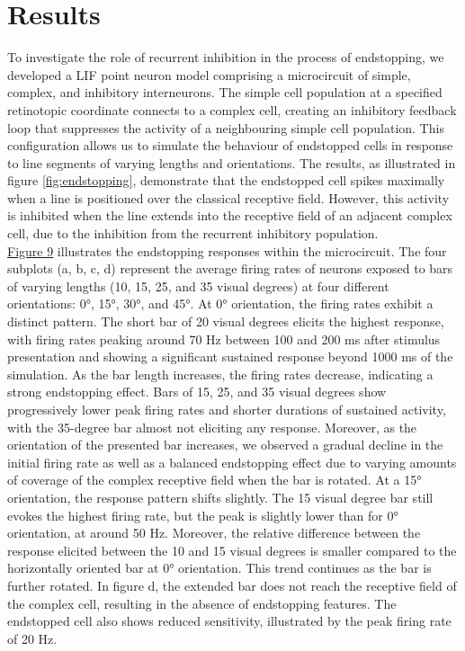 \documentclass[12pt]{article}
\begin{document}
\section*{Results}
\setlength{\parindent}{24pt}
To investigate the role of recurrent inhibition in the process of endstopping, we developed a LIF point neuron model comprising a microcircuit of simple, complex, and inhibitory interneurons. The simple cell population at a specified retinotopic coordinate connects to a complex cell, creating an inhibitory feedback loop that suppresses the activity of a neighbouring simple cell population. This configuration allows us to simulate the behaviour of endstopped cells in response to line segments of varying lengths and orientations. The results, as illustrated in figure \ref{fig:endstopping}, demonstrate that the endstopped cell spikes maximally when a line is positioned over the classical receptive field. However, this activity is inhibited when the line extends into the receptive field of an adjacent complex cell, due to the inhibition from the recurrent inhibitory population.
\setlength{\parindent}{0pt}
\\
\hyperref[fig:endstopping]{Figure 9} illustrates the endstopping responses within the microcircuit. The four subplots (a, b, c, d) represent the average firing rates of neurons exposed to bars of varying lengths (10, 15, 25, and 35 visual degrees) at four different orientations: 0°, 15°, 30°, and 45°. At 0° orientation, the firing rates exhibit a distinct pattern. The short bar of 20 visual degrees elicits the highest response, with firing rates peaking around 70 Hz between 100 and 200 ms after stimulus presentation and showing a significant sustained response beyond 1000 ms of the simulation. As the bar length increases, the firing rates decrease, indicating a strong endstopping effect. Bars of 15, 25, and 35 visual degrees show progressively lower peak firing rates and shorter durations of sustained activity, with the 35-degree bar almost not eliciting any response. Moreover, as the orientation of the presented bar increases, we observed a gradual decline in the initial firing rate as well as a balanced endstopping effect due to varying amounts of coverage of the complex receptive field when the bar is rotated. At a 15° orientation, the response pattern shifts slightly. The 15 visual degree bar still evokes the highest firing rate, but the peak is slightly lower than for 0° orientation, at around 50 Hz. Moreover, the relative difference between the response elicited between the 10 and 15 visual degrees is smaller compared to the horizontally oriented bar at 0° orientation. This trend continues as the bar is further rotated. In figure d, the extended bar does not reach the receptive field of the complex cell, resulting in the absence of endstopping features. The endstopped cell also shows reduced sensitivity, illustrated by the peak firing rate of 20 Hz.
\end{document}
